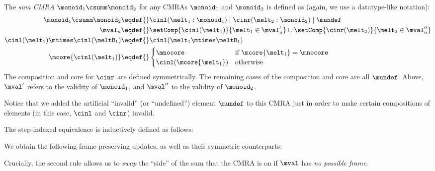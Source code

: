 The \emph{sum CMRA} $\monoid_1 \csumm \monoid_2$ for any CMRAs $\monoid_1$ and $\monoid_2$ is defined as (again, we use a datatype-like notation):
\begin{align*}
  \monoid_1 \csumm \monoid_2 \eqdef{}& \cinl(\melt_1:\monoid_1) \mid \cinr(\melt_2:\monoid_2) \mid \mundef \\
  \mval_n \eqdef{}& \setComp{\cinl(\melt_1)}{\melt_1 \in \mval'_n}
    \cup \setComp{\cinr(\melt_2)}{\melt_2 \in \mval''_n}  \\
  \cinl(\melt_1) \mtimes \cinl(\meltB_1) \eqdef{}& \cinl(\melt_1 \mtimes \meltB_1)  \\
  \mcore{\cinl(\melt_1)} \eqdef{}& \begin{cases}\mnocore & \text{if $\mcore{\melt_1} = \mnocore$} \\ \cinl({\mcore{\melt_1}}) & \text{otherwise} \end{cases}
\end{align*}
The composition and core for $\cinr$ are defined symmetrically.
The remaining cases of the composition and core are all $\mundef$.
Above, $\mval'$ refers to the validity of $\monoid_1$, and $\mval''$ to the validity of $\monoid_2$.

Notice that we added the artificial ``invalid'' (or ``undefined'') element $\mundef$ to this CMRA just in order to make certain compositions of elements (in this case, $\cinl$ and $\cinr$) invalid.

The step-indexed equivalence is inductively defined as follows:
\begin{mathpar}


\end{mathpar}


We obtain the following frame-preserving updates, as well as their symmetric counterparts:
Crucially, the second rule allows us to \emph{swap} the ``side'' of the sum that the CMRA is on if $\mval$ has \emph{no possible frame}.

